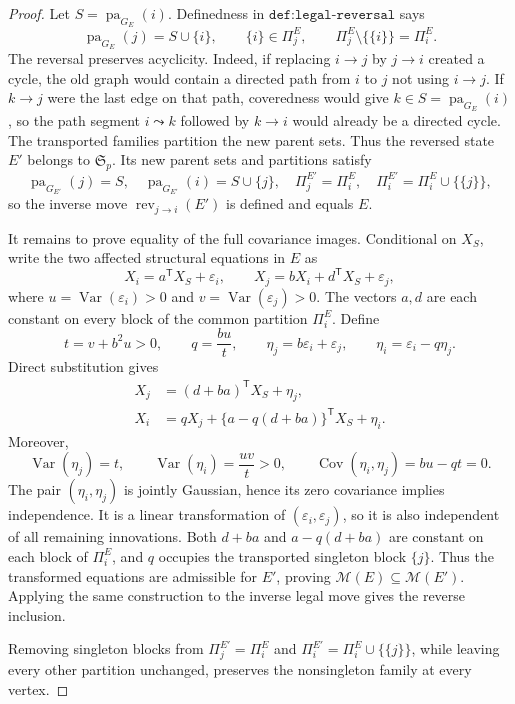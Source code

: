 \documentclass{article}
\begin{document}
\begin{proof}
Let \(S=\operatorname{pa}_{G_E}(i)\). Definedness in \(\texttt{def:legal-reversal}\) says
\[
 \operatorname{pa}_{G_E}(j)=S\cup\{i\},
 \qquad \{i\}\in\Pi^E_j,
 \qquad \Pi^E_j\setminus\{\{i\}\}=\Pi^E_i.
\]
The reversal preserves acyclicity. Indeed, if replacing \(i\to j\) by \(j\to i\) created a cycle, the old graph would contain a directed path from \(i\) to \(j\) not using \(i\to j\). If \(k\to j\) were the last edge on that path, coveredness would give \(k\in S=\operatorname{pa}_{G_E}(i)\), so the path segment \(i\leadsto k\) followed by \(k\to i\) would already be a directed cycle. The transported families partition the new parent sets. Thus the reversed state \(E'\) belongs to \(\mathfrak S_p\). Its new parent sets and partitions satisfy
\[
 \operatorname{pa}_{G_{E'}}(j)=S,
 \quad \operatorname{pa}_{G_{E'}}(i)=S\cup\{j\},
 \quad \Pi^{E'}_j=\Pi^E_i,
 \quad \Pi^{E'}_i=\Pi^E_i\cup\{\{j\}\},
\]
so the inverse move \(\operatorname{rev}_{j\to i}(E')\) is defined and equals \(E\).

It remains to prove equality of the full covariance images. Conditional on \(X_S\), write the two affected structural equations in \(E\) as
\[
 X_i=a^{\mathsf T}X_S+\varepsilon_i,
 \qquad
 X_j=bX_i+d^{\mathsf T}X_S+\varepsilon_j,
\]
where \(u=\operatorname{Var}(\varepsilon_i)>0\) and \(v=\operatorname{Var}(\varepsilon_j)>0\). The vectors \(a,d\) are each constant on every block of the common partition \(\Pi^E_i\). Define
\[
 t=v+b^2u>0,
 \qquad q=\frac{bu}{t},
 \qquad \eta_j=b\varepsilon_i+\varepsilon_j,
 \qquad \eta_i=\varepsilon_i-q\eta_j.
\]
Direct substitution gives
\[
 \begin{aligned}
 X_j&=(d+ba)^{\mathsf T}X_S+\eta_j,\\
 X_i&=qX_j+\{a-q(d+ba)\}^{\mathsf T}X_S+\eta_i.
 \end{aligned}
\]
Moreover,
\[
 \operatorname{Var}(\eta_j)=t,
 \qquad
 \operatorname{Var}(\eta_i)=\frac{uv}{t}>0,
 \qquad
 \operatorname{Cov}(\eta_i,\eta_j)=bu-qt=0.
\]
The pair \((\eta_i,\eta_j)\) is jointly Gaussian, hence its zero covariance implies independence. It is a linear transformation of \((\varepsilon_i,\varepsilon_j)\), so it is also independent of all remaining innovations. Both \(d+ba\) and \(a-q(d+ba)\) are constant on each block of \(\Pi^E_i\), and \(q\) occupies the transported singleton block \(\{j\}\). Thus the transformed equations are admissible for \(E'\), proving \(\mathcal M(E)\subseteq\mathcal M(E')\). Applying the same construction to the inverse legal move gives the reverse inclusion.

Removing singleton blocks from \(\Pi^{E'}_j=\Pi^E_i\) and \(\Pi^{E'}_i=\Pi^E_i\cup\{\{j\}\}\), while leaving every other partition unchanged, preserves the nonsingleton family at every vertex.
\end{proof}
\end{document}
